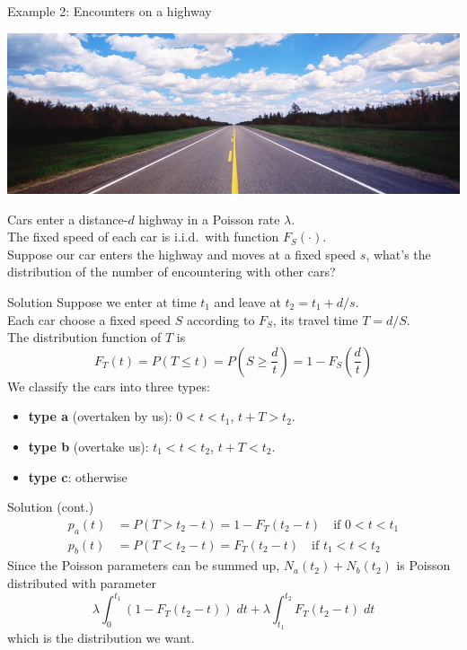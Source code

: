 \documentclass[mathserif]{beamer}
\begin{document}
\begin{frame}{Example 2: Encounters on a highway}
\begin{center}
\includegraphics[scale=1]{highway_scale.jpg}
\end{center}
Cars enter a distance-$d$ highway in a Poisson rate $\lambda$.\\
The fixed speed of each car is i.i.d.\ with function $F_S(\cdot)$.\\
Suppose our car enters the highway and moves at a fixed speed $s$,
what's the distribution of the number of encountering with other cars?
\end{frame}

\begin{frame}{Solution}
Suppose we enter at time $t_1$ and leave at $t_2 = t_1 + d/s$.\\
Each car choose a fixed speed $S$ according to $F_S$, its travel time $T = d/S$.\\
The distribution function of $T$ is
\[
F_T(t) = P(T\leq t) = P(S\geq \frac{d}{t}) = 1 - F_S(\frac{d}{t})
\]
We classify the cars into three types:
\begin{itemize}
\item \textbf{type a} (overtaken by us): $0 < t < t_1$, $t + T > t_2$.
\item \textbf{type b} (overtake us): $t_1 < t < t_2$, $t + T < t_2$.
\item \textbf{type c}: otherwise
\end{itemize}
\end{frame}

\begin{frame}{Solution (cont.)}
\begin{align*}
p_a(t) & = P(T > t_2 - t) = 1 - F_T(t_2 - t) \quad\text{if } 0 < t < t_1 \\
p_b(t) & = P(T < t_2 - t) = F_T(t_2 - t) \quad\text{if } t_1 < t < t_2
\end{align*}
Since the Poisson parameters can be summed up, $N_a(t_2) + N_b(t_2)$ is Poisson distributed with parameter
\[
\lambda\int_0^{t_1} (1 - F_T(t_2 - t))\;dt + \lambda\int_{t_1}^{t_2} F_T(t_2 - t)\;dt
\]
which is the distribution we want.
\end{frame}
\end{document}
